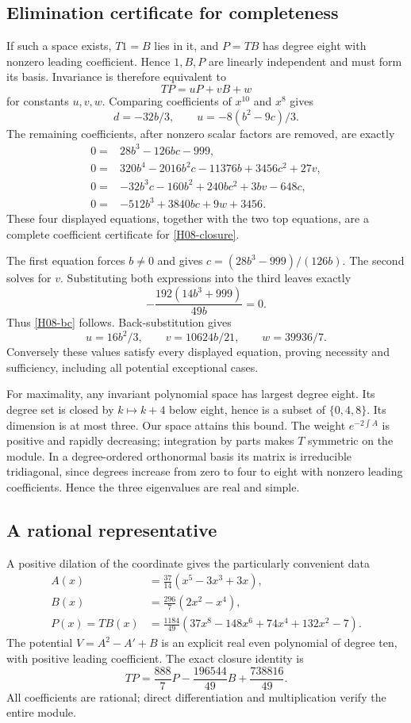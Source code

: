 \documentclass[11pt,a4paper]{article}
\theoremstyle{definition}\newtheorem{definition}[theorem]{Definition}
\theoremstyle{remark}\newtheorem{remark}[theorem]{Remark}
\numberwithin{equation}{section}
\begin{document}
\subsection{Elimination certificate for completeness}\label{H08-sec-2}
If such a space exists, $T1=B$ lies in it, and $P=TB$ has degree eight with nonzero leading coefficient. Hence $1,B,P$ are linearly independent and must form its basis. Invariance is therefore equivalent to
\begin{equation}\label{H08-closure}TP=uP+vB+w\end{equation}
for constants $u,v,w$.
Comparing coefficients of $x^{10}$ and $x^8$ gives
\[d=-32b/3,\qquad u=-8(b^2-9c)/3.
\]
The remaining coefficients, after nonzero scalar factors are removed, are exactly
\begin{align*}
0={}&28b^3-126bc-999,\\
0={}&320b^4-2016b^2c-11376b+3456c^2+27v,\\
0={}&-32b^3c-160b^2+240bc^2+3bv-648c,\\
0={}&-512b^3+3840bc+9w+3456.
\end{align*}
These four displayed equations, together with the two top equations, are a complete coefficient certificate for \eqref{H08-closure}.

The first equation forces $b\ne0$ and gives $c=(28b^3-999)/(126b)$. The second solves for $v$. Substituting both expressions into the third leaves exactly
\[-\frac{192(14b^3+999)}{49b}=0.
\]
Thus \eqref{H08-bc} follows. Back-substitution gives
\[u=16b^2/3,\qquad v=10624b/21,\qquad w=39936/7.
\]
Conversely these values satisfy every displayed equation, proving necessity and sufficiency, including all potential exceptional cases.

For maximality, any invariant polynomial space has largest degree eight. Its degree set is closed by $k\mapsto k+4$ below eight, hence is a subset of $\{0,4,8\}$. Its dimension is at most three. Our space attains this bound. The weight $e^{-2\int A}$ is positive and rapidly decreasing; integration by parts makes $T$ symmetric on the module. In a degree-ordered orthonormal basis its matrix is irreducible tridiagonal, since degrees increase from zero to four to eight with nonzero leading coefficients. Hence the three eigenvalues are real and simple.
\subsection{A rational representative}\label{H08-sec-3}
A positive dilation of the coordinate gives the particularly convenient data
\begin{align*}
A(x)&=\frac{37}{14}(x^5-3x^3+3x),\\
B(x)&=\frac{296}{7}(2x^2-x^4),\\
P(x)=TB(x)&=\frac{1184}{49}(37x^8-148x^6+74x^4+132x^2-7).
\end{align*}
The potential $V=A^2-A'+B$ is an explicit real even polynomial of degree ten, with positive leading coefficient. The exact closure identity is
\[TP=\frac{888}{7}P-\frac{196544}{49}B+\frac{738816}{49}.
\]
All coefficients are rational; direct differentiation and multiplication verify the entire module.
\end{document}
